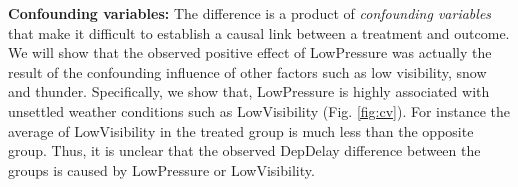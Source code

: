  {\bf Confounding variables:} The difference is a product of {\em confounding variables}
  that make it difficult to establish a causal link between a treatment and outcome.
  We will show that the observed positive effect of LowPressure
  was actually the result of the confounding influence of other factors such as low visibility, snow and thunder.
     Specifically, we show that, LowPressure is highly associated with unsettled weather conditions
    such as LowVisibility (Fig. \ref{fig:cv}). For instance the average of LowVisibility in the treated group is much less than
  the opposite group. Thus, it is unclear that the observed DepDelay difference between the groups is caused by LowPressure or LowVisibility.


